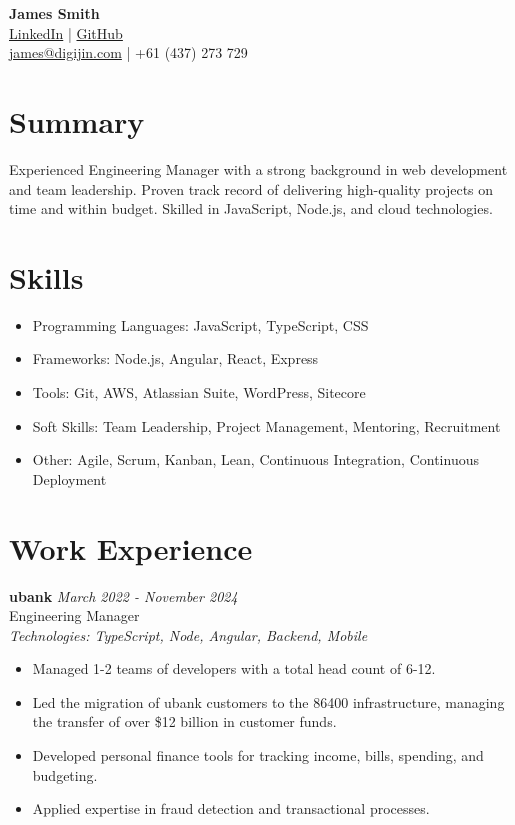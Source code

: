\documentclass[a4paper,10pt]{article}
\begin{document}
\begin{center}
    {\Huge \textbf{James Smith}} \\
    \href{https://www.linkedin.com/in/digijin/}{LinkedIn} | \href{https://github.com/digijin}{GitHub} \\
    \href{mailto:james@digijin.com}{james@digijin.com} | +61 (437) 273 729
\end{center}

\section*{Summary}
Experienced Engineering Manager with a strong background in web development and team leadership. Proven track record of delivering high-quality projects on time and within budget. Skilled in JavaScript, Node.js, and cloud technologies.

\section*{Skills}
\begin{itemize}
    \item Programming Languages: JavaScript, TypeScript, CSS
    \item Frameworks: Node.js, Angular, React, Express
    \item Tools: Git, AWS, Atlassian Suite, WordPress, Sitecore
    \item Soft Skills: Team Leadership, Project Management, Mentoring, Recruitment
    \item Other: Agile, Scrum, Kanban, Lean, Continuous Integration, Continuous Deployment
\end{itemize}

\section*{Work Experience}

\textbf{ubank} \hfill \textit{March 2022 - November 2024} \\
Engineering Manager \\
\textit{Technologies: TypeScript, Node, Angular, Backend, Mobile}
\begin{itemize}
    \item Managed 1-2 teams of developers with a total head count of 6-12.
    \item Led the migration of ubank customers to the 86400 infrastructure, managing the transfer of over \$12 billion in customer funds.
    \item Developed personal finance tools for tracking income, bills, spending, and budgeting.
    \item Applied expertise in fraud detection and transactional processes.
\end{itemize}
\end{document}
